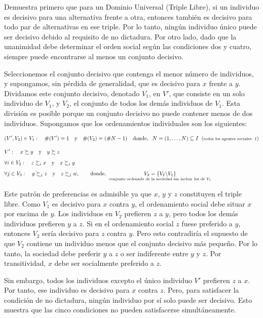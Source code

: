 \documentclass[10pt,a4paper]{article}
\begin{document}
Demuestra primero que para un Dominio Universal (Triple Libre), si un individuo es decisivo para una alternativa frente a otra, entonces también es decisivo para todo par de alternativas en ese triple. Por lo tanto, ningún individuo único puede ser decisivo debido al requisito de no dictadura. Por otro lado, dado que la unanimidad debe determinar el orden social según las condiciones dos y cuatro, siempre puede encontrarse al menos un conjunto decisivo.

Seleccionemos el conjunto decisivo que contenga el menor número de individuos, y supongamos, sin pérdida de generalidad, que es decisivo para $x$ frente a $y$. Dividamos este conjunto decisivo, denotado $V_1$, en $V'$, que consiste en un solo individuo de $V_1$, y $V_2$, el conjunto de todos los demás individuos de $V_1$. Esta división es posible porque un conjunto decisivo no puede contener menos de dos individuos. Supongamos que los ordenamientos individuales son los siguientes:

$$\begin{aligned}
    &(V',V_2)\in V_1:\quad \#(V')=1\quad\text{y}\quad\#(V_2)=(\#N-1)\quad \text{donde},\;\;N=(1,\ldots,N)\subseteq I\;\;(\text{\scriptsize todos los agentes sociales: $I$})\\[1em]
    &V':\quad x\succsim y\quad \text{y}\quad y\succsim z\\[0.5em]
    &\forall i\in V_2:\quad z\succsim_i x\quad \text{y}\quad x\succsim_i y\\[0.5em]
    &\forall j\in V_3:\quad y\succsim_j z\quad \text{y}\quad z\succsim_j w,\qquad \text{donde,}\;\;\underset{\text{\scriptsize conjunto ordenado de la sociedad sin incluir los de $V_1$}}{V_3=\{V_I\backslash V_1\}}\\
\end{aligned}$$

Este patrón de preferencias es admisible ya que $x$, $y$ y $z$ constituyen el triple libre. Como $V_1$ es decisivo para $x$ contra $y$, el ordenamiento social debe situar $x$ por encima de $y$. Los individuos en $V_2$ prefieren $z$ a $y$, pero todos los demás individuos prefieren $y$ a $z$. Si en el ordenamiento social $z$ fuese preferido a $y$, entonces $V_2$ sería decisivo para $z$ contra $y$. Pero esto contradiría el supuesto de que $V_2$ contiene un individuo menos que el conjunto decisivo más pequeño. Por lo tanto, la sociedad debe preferir $y$ a $z$ o ser indiferente entre $y$ y $z$. Por transitividad, $x$ debe ser socialmente preferido a $z$.

Sin embargo, todos los individuos excepto el único individuo $V'$ prefieren $z$ a $x$. Por tanto, ese individuo es decisivo para $x$ contra $z$. Pero, para satisfacer la condición de no dictadura, ningún individuo por sí solo puede ser decisivo. Esto muestra que las cinco condiciones no pueden satisfacerse simultáneamente.
\end{document}
